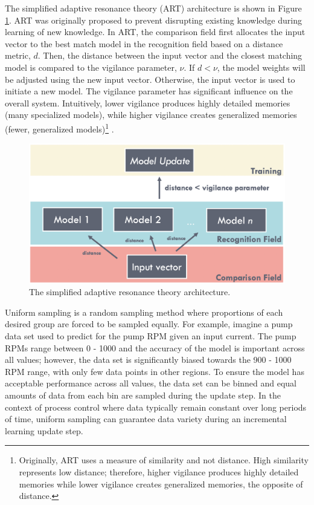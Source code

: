 The simplified adaptive resonance theory (ART) architecture is shown in Figure \ref{fig:02art}. ART was originally proposed to prevent disrupting existing knowledge during learning of new knowledge.  In ART, the comparison field first allocates the input vector to the best match model in the recognition field based on a distance metric, $d$.  Then, the distance between the input vector and the closest matching model is compared to the vigilance parameter, $\nu$.  If $d < \nu$, the model weights will be adjusted using the new input vector.  Otherwise, the input vector is used to initiate a new model.  The vigilance parameter has significant influence on the overall system.  Intuitively, lower vigilance produces highly detailed memories (many specialized models), while higher vigilance creates generalized memories (fewer, generalized models)\footnote{Originally, ART uses a measure of similarity and not distance.  High similarity represents low distance; therefore, higher vigilance produces highly detailed memories while lower vigilance creates generalized memories, the opposite of distance.} \cite{art}.

\begin{figure}[h]
    \centering
    \includegraphics[width=\textwidth]{images/ch2/02art.jpeg}
    \caption{The simplified adaptive resonance theory architecture.}
    \label{fig:02art}
\end{figure}

Uniform sampling is a random sampling method where proportions of each desired group are forced to be sampled equally. For example, imagine a pump data set used to predict for the pump RPM given an input current.  The pump RPMs range between 0 - 1000 and the accuracy of the model is important across all values; however, the data set is significantly biased towards the 900 - 1000 RPM range, with only few data points in other regions. To ensure the model has acceptable performance across all values, the data set can be binned and equal amounts of data from each bin are sampled during the update step.  In the context of process control where data typically remain constant over long periods of time, uniform sampling can guarantee data variety during an incremental learning update step.

